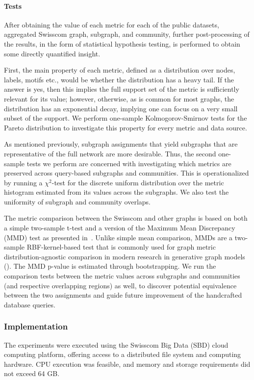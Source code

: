 \paragraph{Tests} After obtaining the value of each metric for each of the public datasets, aggregated Swisscom graph, subgraph, and community, further post-processing of the results, in the form of statistical hypothesis testing, is performed to obtain some directly quantified insight.

First, the main property of each metric, defined as a distribution over nodes, labels, motifs etc., would be whether the distribution has a heavy tail. If the answer is yes, then this implies the full support set of the metric is sufficiently relevant for its value; however, otherwise, as is common for most graphs, the distribution has an exponential decay, implying one can focus on a very small subset of the support. We perform one-sample Kolmogorov-Smirnov tests for the Pareto distribution to investigate this property for every metric and data source.

As mentioned previously, subgraph assignments that yield subgraphs that are representative of the full network are more desirable. Thus, the second one-sample tests we perform are concerned with investigating which metrics are preserved across query-based subgraphs and communities. This is operationalized by running a $\chi^2$-test for the discrete uniform distribution over the metric histogram estimated from its values across the subgraphs. We also test the uniformity of subgraph and community overlaps.

The metric comparison between the Swisscom and other graphs is based on both a simple two-sample t-test and a version of the Maximum Mean Discrepancy (MMD) test as presented in~\cite{gretton_kernel_2012}. Unlike simple mean comparison, MMDs are a two-sample RBF-kernel-based test that is commonly used for graph metric distribution-agnostic comparison in modern research in generative graph models (\cite{you_graphrnn_2018, krawczuk_gg-gan_2020}). The MMD p-value is estimated through bootstrapping. We run the comparison tests between the metric values across subgraphs and communities (and respective overlapping regions) as well, to discover potential equivalence between the two assignments and guide future improvement of the handcrafted database queries.


\subsubsection{Implementation}
The experiments were executed using the Swisscom Big Data (SBD) cloud computing platform, offering access to a distributed file system and computing hardware. CPU execution was feasible, and memory and storage requirements did not exceed 64 GB.

